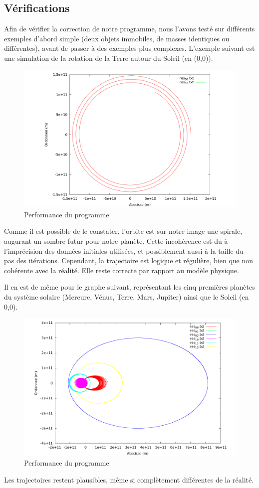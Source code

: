 \documentclass[a4paper,11pt]{article}
\begin{document}
\subsection{Vérifications}
Afin de vérifier la correction de notre programme, nous l'avons testé sur différents exemples d'abord simple (deux objets immobiles, de masses identiques ou différentes), avant de passer à des exemples plus complexes.
L'exemple suivant est une simulation de la rotation de la Terre autour du Soleil (en (0,0)).
\begin{figure}[h!]
  \centering
  \includegraphics[width=\textwidth]{orbite_terre.png}
  \caption{Performance du programme}
  \label{perf}
\end{figure}Comme il est possible de le constater, l'orbite est sur notre image une spirale, augurant un sombre futur pour notre planète. Cette incohérence est du à l'imprécision des données initiales utilisées, et possiblement aussi à la taille du pas des itérations.
Cependant, la trajectoire est logique et régulière, bien que non cohérente avec la réalité. Elle reste correcte par rapport au modèle physique.

Il en est de même pour le graphe suivant, représentant les cinq premières planètes du système solaire (Mercure, Vénus, Terre, Mars, Jupiter) ainsi que le Soleil (en 0,0).
\begin{figure}[h!]
  \centering
  \includegraphics[width=\textwidth]{systeme.png}
  \caption{Performance du programme}
  \label{perf}
\end{figure}
Les trajectoires restent plausibles, même si complètement différentes de la réalité.  
\end{document}
